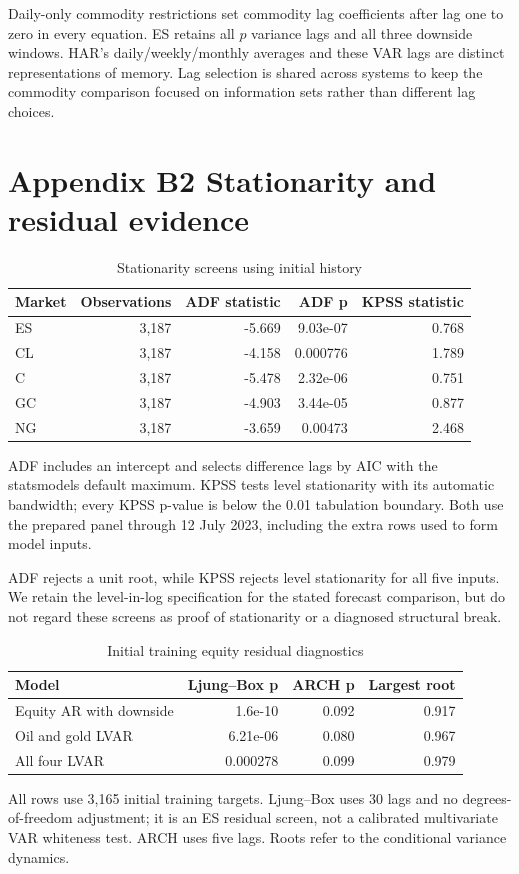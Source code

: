 \documentclass[11pt,letterpaper]{article}
\newcommand{\appendixpage}[2]{\clearpage\section*{#1}\label{#2}}
\begin{document}
Daily-only commodity restrictions set commodity lag coefficients after lag one
to zero in every equation. ES retains all $p$ variance lags and all three downside
windows. HAR's daily/weekly/monthly averages and these VAR lags are distinct
representations of memory. Lag selection is shared across systems to keep the
commodity comparison focused on information sets rather than different lag choices.

\appendixpage{Appendix B2 Stationarity and residual evidence}{app:diagnostics}
\begin{table}[H]
\centering
\caption{Stationarity screens using initial history}\label{tab:stationarity}
\small
\begin{tabular}{lrrrr}
\toprule
Market & Observations & ADF statistic & ADF p & KPSS statistic \\
\midrule
ES & 3,187 & -5.669 & 9.03e-07 & 0.768 \\
CL & 3,187 & -4.158 & 0.000776 & 1.789 \\
C & 3,187 & -5.478 & 2.32e-06 & 0.751 \\
GC & 3,187 & -4.903 & 3.44e-05 & 0.877 \\
NG & 3,187 & -3.659 & 0.00473 & 2.468 \\
\bottomrule
\end{tabular}
\end{table}
{\footnotesize ADF includes an intercept and selects difference lags by AIC with the statsmodels default maximum. KPSS tests level stationarity with its automatic bandwidth; every KPSS p-value is below the 0.01 tabulation boundary. Both use the prepared panel through 12 July 2023, including the extra rows used to form model inputs.\par}

ADF rejects a unit root, while KPSS rejects level stationarity for all five inputs.
We retain the level-in-log specification for the stated forecast comparison, but
do not regard these screens as proof of stationarity or a diagnosed structural break.

\begin{table}[H]
\centering
\caption{Initial training equity residual diagnostics}\label{tab:diagnostics}
\small
\begin{tabular}{p{2.5in}rrr}
\toprule
Model & Ljung--Box p & ARCH p & Largest root \\
\midrule
Equity AR with downside & 1.6e-10 & 0.092 & 0.917 \\
Oil and gold LVAR & 6.21e-06 & 0.080 & 0.967 \\
All four LVAR & 0.000278 & 0.099 & 0.979 \\
\bottomrule
\end{tabular}
\end{table}
{\footnotesize All rows use 3,165 initial training targets. Ljung--Box uses 30 lags and no degrees-of-freedom adjustment; it is an ES residual screen, not a calibrated multivariate VAR whiteness test. ARCH uses five lags. Roots refer to the conditional variance dynamics.\par}
\end{document}
